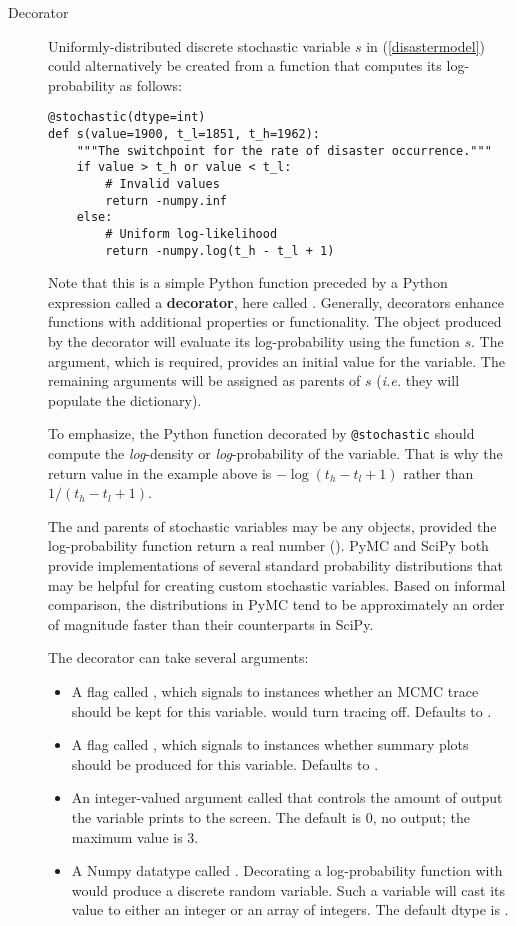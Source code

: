 \begin{description}
    
    \item[Decorator] Uniformly-distributed discrete stochastic variable $s$ in (\ref{disastermodel}) could alternatively be created from a function that computes its log-probability as follows:
\begin{verbatim}
@stochastic(dtype=int)
def s(value=1900, t_l=1851, t_h=1962):
    """The switchpoint for the rate of disaster occurrence."""
    if value > t_h or value < t_l:
        # Invalid values
        return -numpy.inf
    else:
        # Uniform log-likelihood
        return -numpy.log(t_h - t_l + 1) 
\end{verbatim}
Note that this is a simple Python function preceded by a Python expression called a \textbf{decorator}, here called . Generally, decorators enhance functions with additional properties or functionality. The  object produced by the  decorator will evaluate its log-probability using the function $s$. The  argument, which is required, provides an initial value for the variable. The remaining arguments will be assigned as parents of $s$ (\emph{i.e.} they will populate the  dictionary).

To emphasize, the Python function decorated by \texttt{@stochastic} should compute the \emph{log}-density or \emph{log}-probability of the variable. That is why the return value in the example above is $-\log(t_h-t_l+1)$ rather than $1/(t_h-t_l+1)$.

The  and parents of stochastic variables may be any objects, provided the log-probability function return a real number (). PyMC and SciPy both provide implementations of several standard probability distributions that may be helpful for creating custom stochastic variables. Based on informal comparison, the distributions in PyMC tend to be approximately an order of magnitude faster than their counterparts in SciPy.

    The decorator  can take several arguments: 
    \begin{itemize}
        \item A flag called , which signals to  instances whether an MCMC trace should be kept for this variable.  would turn tracing off. Defaults to .
        \item A flag called , which signals to  instances whether summary plots should be produced for this variable. Defaults to .
        \item An integer-valued argument called  that controls the amount of output the variable prints to the screen. The default is $0$, no output; the maximum value is $3$. 
        \item A Numpy datatype called . Decorating a log-probability function with  would produce a discrete random variable. Such a variable will cast its value to either an integer or an array of integers. The default dtype is .
    \end{itemize} 


\end{description}
